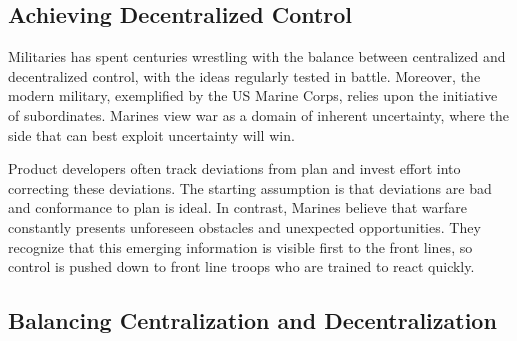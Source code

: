 \documentclass{article}
\begin{document}
\begin{center}
     \section{Achieving Decentralized Control}
\end{center}

\begin{multicols}{2}

\noindent
Militaries has spent centuries wrestling with the balance between centralized and decentralized control, with the ideas regularly tested in battle. Moreover, the modern military, exemplified by the US Marine Corps, relies upon the initiative of subordinates. Marines view war as a domain of inherent uncertainty, where the side that can best exploit uncertainty will win.

Product developers often track deviations from plan and invest effort into correcting these deviations. The starting assumption is that deviations are bad and conformance to plan is ideal. In contrast, Marines believe that warfare constantly presents unforeseen obstacles and unexpected opportunities. They recognize that this emerging information is visible first to the front lines, so control is pushed down to front line troops who are trained to react quickly.

\end{multicols}

\begin{center}
\section{Balancing Centralization and Decentralization}
\end{center}
\end{document}
